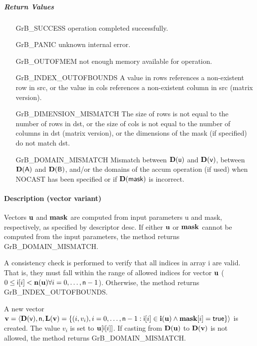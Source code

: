 \subparagraph{Return Values}


\begin{itemize}[leftmargin=2.1in]
\item[{\sf GrB\_SUCCESS}]     operation completed successfully.
\item[{\sf GrB\_PANIC}]        unknown internal error.
\item[{\sf GrB\_OUTOFMEM}]    not enough memory available for operation.
\item[{\sf GrB\_INDEX\_OUTOFBOUNDS}]
        A value in rows references a non-existent row in src, or
        the value in cols references a non-existent column in src (matrix version).
\item[{\sf GrB\_DIMENSION\_MISMATCH}] 
        The size of rows is not equal to the number of rows in dst, or
        the size of cols is not equal to the number of columns in dst (matrix version), or
        the dimensions of the mask (if specified) do not match dst.
\item[{\sf GrB\_DOMAIN\_MISMATCH}]    Mismatch between $\bold{D}({\sf u})$ and $\bold{D}({\sf v})$, between $\bold{D}({\sf A})$ and $\bold{D}({\sf B})$, and/or the domains of the 
                                      {\sf accum} operation (if used) when {\sf NOCAST} has
                                      been specified or if $\bold{D}(\sf mask)$ is incorrect.
\end{itemize}


\paragraph{Description (vector variant)}

Vectors ${\bf u}$ and ${\bf mask}$ are computed from input
parameters {\sf u} and {\sf mask}, respectively, as specified by
descriptor {\sf desc}.  If either ${\bf u}$ or ${\bf mask}$
cannot be computed from the input parameters, the method returns {\sf
GrB\_DOMAIN\_MISMATCH}.

A consistency check is performed to verify that all indices in array
{\sf i} are valid. That is, they must fall within the range of allowed
indices for vector ${\bf u}$ ($0 \leq {\sf i}[i] < \bold{n}({\bf u})
\forall i = 0,\ldots,{\sf n}-1$).  Otherwise, the method returns {\sf
GrB\_INDEX\_OUTOFBOUNDS}.

A new vector ${\bf v} = \langle \bold{D}({\sf v}),{\sf n},
\bold{L}({\bf v}) = \{ (i,v_i), i = 0,\ldots,{\sf n}-1 : {\sf i}[i]
\in \bold{i}({\bf u}) \wedge {\bf mask}[i] = {\sf true} \} \rangle$
is created.  The value $v_i$ is set to ${\bf u}[{\sf i}[i]]$. If
casting from $\bold{D}({\bf u})$ to $\bold{D}({\bf v})$ is not
allowed, the method returns {\sf GrB\_DOMAIN\_MISMATCH}.

